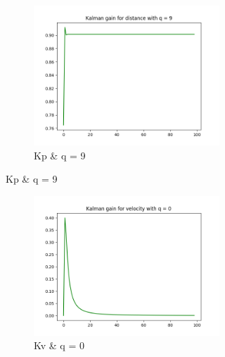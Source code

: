 \documentclass{article}
\begin{document}
\begin{figure}[H]
\begin{subfigure}{1\textwidth}
                \begin{subfigure}{.3\textwidth}  
                    \includegraphics[width=1\linewidth]{./img/k11_9.png}
                    \caption[font=0.1mm]{Kp \& q = 9 }
                \end{subfigure}
            \end{subfigure}
            \begin{subfigure} {1\textwidth}    
                \begin{subfigure}{.3\textwidth}  
                    \includegraphics[width=1\linewidth]{./img/k22_0.png}
                    \caption{Kv \& q = 0 }
                \end{subfigure}
                \begin{subfigure}{.3\textwidth}  

\end{subfigure}
\end{subfigure}
\end{figure}
\end{document}
